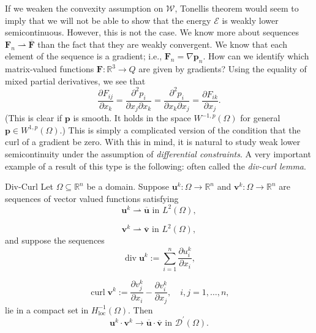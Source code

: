 If we weaken the convexity assumption on $\mathcal{W}$, Tonelli\textquotesingle s theorem would seem to imply that we will not be able to show that the energy $\mathcal{E}$ is weakly lower semicontinuous. However, this is not the case. We know more about sequences $\bm{F}_n\rightharpoonup\overline{\bm{F}}$ than the fact that they are weakly convergent. We know that each element of the sequence is a gradient; i.e., $\bm{F}_n=\nabla\bm{p}_n$. How can we identify which matrix-valued functions $\bm{F}:\mathbb{R}^3\to Q$ are given by gradients? Using the equality of mixed partial derivatives, we see that
\begin{equation}\label{eq:deformation-gradient-mixed-partial-constraint}
\dfrac{\partial F_{ij}}{\partial x_k}=\dfrac{\partial^2p_i}{\partial x_j\partial x_k}=\dfrac{\partial^2p_i}{\partial x_k\partial x_j}=\dfrac{\partial F_{ik}}{\partial x_j}.
\end{equation}
(This is clear if $\bm{p}$ is smooth. It holds in the space $W^{-1,p}(\Omega)$ for general $\bm{p}\in W^{1,p}(\Omega)$.) This is simply a complicated version of the condition that the curl of a gradient be zero. With this in mind, it is natural to study weak lower semicontinuity under the assumption of \emph{differential constraints}. A very important example of a result of this type is the following: often called the \emph{div-curl lemma}.

\begin{Theorem}{Div-Curl}
\label{thm:div-curl-compact-negative-norm}
Let $\Omega\subseteq\mathbb{R}^n$ be a domain. Suppose $\bm{u}^k:\Omega\to\mathbb{R}^n$ and $\bm{v}^k:\Omega\to\mathbb{R}^n$ are sequences of vector valued functions satisfying
\begin{equation}\label{eq:div-curl-first-vector-weak-limit}
\bm{u}^k\rightharpoonup\overline{\bm{u}}\text{ in }L^2(\Omega),
\end{equation}

\begin{equation}\label{eq:div-curl-second-vector-weak-limit}
\bm{v}^k\rightharpoonup\overline{\bm{v}}\text{ in }L^2(\Omega),
\end{equation}
and suppose the sequences
\begin{equation}\label{eq:div-curl-divergence-sequence}
\operatorname{div}\bm{u}^k:=\sum_{i=1}^n\dfrac{\partial u_i^k}{\partial x_i},
\end{equation}

\begin{equation}\label{eq:div-curl-curl-sequence}
\operatorname{curl}\bm{v}^k:=\dfrac{\partial v_j^k}{\partial x_i}-\dfrac{\partial v_i^k}{\partial x_j},\quad i,j=1,\ldots,n,
\end{equation}
lie in a compact set in $H_{\mathrm{loc}}^{-1}(\Omega)$. Then
\begin{equation}\label{eq:div-curl-product-distributional-limit}
\bm{u}^k\cdot\bm{v}^k\to\overline{\bm{u}}\cdot\overline{\bm{v}}\text{ in }\mathcal{D}^{\prime}(\Omega).
\end{equation}

\end{Theorem}

